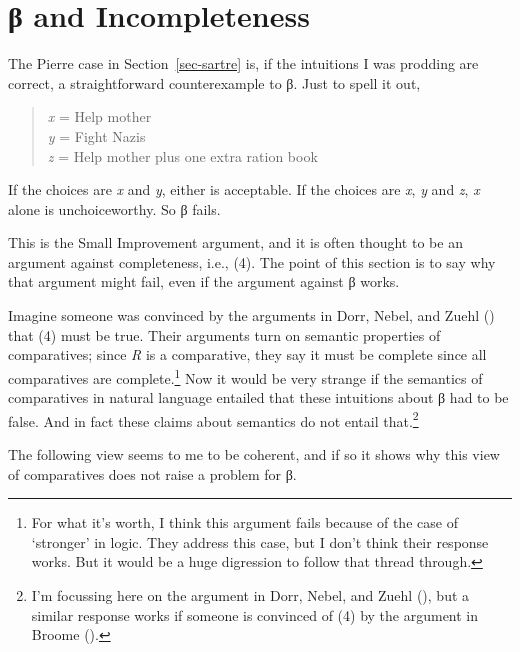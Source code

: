 \documentclass[
  11pt,
  letterpaper,
  DIV=11,
  numbers=noendperiod,
  twoside]{scrartcl}
\begin{document}
\section{β and Incompleteness}\label{sec-dorr}

The Pierre case in Section~\ref{sec-sartre} is, if the intuitions I was
prodding are correct, a straightforward counterexample to β. Just to
spell it out,

\begin{quote}
\emph{x} = Help mother\\
\emph{y} = Fight Nazis\\
\emph{z} = Help mother plus one extra ration book
\end{quote}

If the choices are \emph{x} and \emph{y}, either is acceptable. If the
choices are \emph{x}, \emph{y} and \emph{z}, \emph{x} alone is
unchoiceworthy. So β fails.

This is the Small Improvement argument, and it is often thought to be an
argument against completeness, i.e., (4). The point of this section is
to say why that argument might fail, even if the argument against β
works.

Imagine someone was convinced by the arguments in Dorr, Nebel, and Zuehl
() that (4) must be true. Their
arguments turn on semantic properties of comparatives; since \emph{R} is
a comparative, they say it must be complete since all comparatives are
complete.\footnote{For what it's worth, I think this argument fails
  because of the case of `stronger' in logic. They address this case,
  but I don't think their response works. But it would be a huge
  digression to follow that thread through.} Now it would be very
strange if the semantics of comparatives in natural language entailed
that these intuitions about β had to be false. And in fact these claims
about semantics do not entail that.\footnote{I'm focussing here on the
  argument in Dorr, Nebel, and Zuehl
  (), but a similar response works if
  someone is convinced of (4) by the argument in Broome
  ().}

The following view seems to me to be coherent, and if so it shows why
this view of comparatives does not raise a problem for β.
\end{document}
